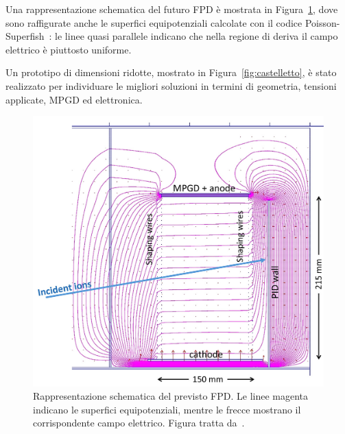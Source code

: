 Una rappresentazione schematica del futuro FPD è mostrata in Figura~\ref{fig:nuovo_fpd}, dove sono raffigurate anche le superfici equipotenziali calcolate con il codice Poisson-Superfish~\cite{superfish:87}: le linee quasi parallele indicano che nella regione di deriva il campo elettrico è piuttosto uniforme.


Un prototipo di dimensioni ridotte, mostrato in Figura~\ref{fig:castelletto}, è stato realizzato per individuare le migliori soluzioni in termini di geometria, tensioni applicate, MPGD ed elettronica.




\begin{figure} [!t]
	\centering
	\includegraphics[scale=0.3]{Grafici/nuovo_fpd.png}
	\caption{Rappresentazione schematica del previsto FPD. Le linee magenta indicano le superfici equipotenziali, mentre le frecce mostrano il corrispondente campo elettrico. Figura tratta da~\cite{cappuzzello:epja18}.} \label{fig:nuovo_fpd}
\end{figure}

